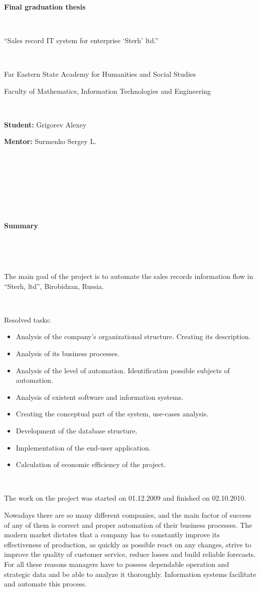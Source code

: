 \documentclass[a4paper, 12pt]{article}
\begin{document}
\begin{center}

\


{\large
\textbf{Final graduation thesis}

\

``Sales record IT system for enterprise `Sterh' ltd.''
}

\


Far Eastern State Academy for Humanities and Social Studies

Faculty of Mathematics, Information Technologies and Engineering

\

\textbf{Student:} Grigorev Alexey

\textbf{Mentor:} Surmenko Sergey L.

\

\

\

\

{\large\textbf{Summary}}

\end{center}

\

\

The main goal of the project is to automate the sales records information flow in ``Sterh, ltd'', Birobidzan, Russia.

\


Resolved tasks:
\begin{itemize}
\item Analysis of the company's organizational structure. Creating its description.
\item Analysis of its business processes.
\item Analysis of the level of automation. Identification possible subjects of automation.
\item Analysis of existent software and information systems.
\item Creating the conceptual part of the system, use-cases analysis.
\item Development of the database structure.
\item Implementation of the end-user application.
\item Calculation of economic efficiency of the project.
\end{itemize}

\

The work on the project was started on 01.12.2009 and finished on 02.10.2010.


\newpage
Nowadays there are so many different companies, and the main factor of success of any of them is correct and proper automation of their business processes. The modern market dictates that a company has to constantly improve its effectiveness of production, as quickly as possible react on any changes, strive to improve the quality of customer service, reduce losses and build reliable forecasts. For all these reasons managers have to possess dependable operation and strategic data and be able to analyze it thoroughly. Information systems facilitate and automate this process.
\end{document}
